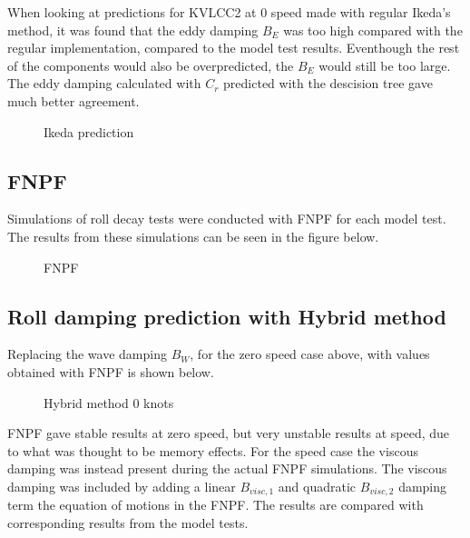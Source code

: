     When looking at predictions for KVLCC2 at 0 speed made with regular
Ikeda's method, it was found that the eddy damping \(B_E\) was too high
compared with the regular implementation, compared to the model test
results. Eventhough the rest of the components would also be
overpredicted, the \(B_E\) would still be too large. The eddy damping
calculated with \(C_r\) predicted with the descision tree gave much
better agreement.

    \begin{figure}
        \begin{center}\end{center}
        \caption{Ikeda prediction}
        \label{fig:ikeda}
    \end{figure}
    
    \subsection{FNPF}\label{fnpf}

Simulations of roll decay tests were conducted with FNPF for each model
test. The results from these simulations can be seen in the figure
below.

    \begin{figure}
        \begin{center}\end{center}
        \caption{FNPF}
        \label{fig:fnpf}
    \end{figure}
    
    \subsection{Roll damping prediction with Hybrid
method}\label{roll-damping-prediction-with-hybrid-method}
Replacing the wave damping $B_W$, for the zero speed case above, with values obtained with FNPF is shown below. 
    \begin{figure}
        \begin{center}\end{center}
        \caption{Hybrid method 0 knots}
        \label{fig:hybrid_0}
    \end{figure}
    
    FNPF gave stable results at zero speed, but very unstable results at
speed, due to what was thought to be memory effects. For the speed case
the viscous damping was instead present during the actual FNPF
simulations. The viscous damping was included by adding a linear
\(B_{visc,1}\) and quadratic \(B_{visc,2}\) damping term the equation of
motions in the FNPF. The results are compared with corresponding results
from the model tests.

